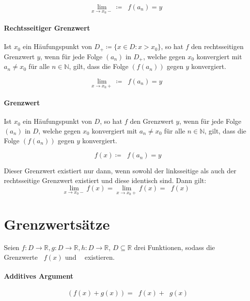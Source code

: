 \documentclass[a4paper, 11pt, accentcolor = tud3b]{tudreport}
\DeclareMathOperator{\liminfty}{\lim _ { n \rightarrow \infty }}
\DeclareMathOperator{\limx}{\lim _ { x \rightarrow x _ 0 }}
\begin{document}
                \[ \lim _ { x \rightarrow x _ 0 - } \coloneqq \liminfty f(a _ n) = y \]

            \paragraph{Rechtsseitiger Grenzwert}
                Ist $ x _ 0 $ ein Häufungspunkt von $ D _ + \coloneqq \{ x \in D : x > x _ 0 \} $, so hat $ f $ den rechtsseitigen Grenzwert $ y $, wenn für jede Folge $ (a _ n) $ in $ D _ + $, welche gegen $ x _ 0 $ konvergiert mit $ a _ n \neq x _ 0 $ für alle $ n \in \mathbb{N} $, gilt, dass die Folge $ (f(a _ n)) $ gegen $ y $ konvergiert.

                \[ \lim _ { x \rightarrow x _ 0 + } \coloneqq \liminfty f(a _ n) = y \]

            \paragraph{Grenzwert}
                Ist $ x _ 0 $ ein Häufungspunkt von $ D $, so hat $ f $ den Grenzwert $ y $, wenn für jede Folge $ (a _ n) $ in $ D $, welche gegen $ x _ 0 $ konvergiert mit $ a _ n \neq x _ 0 $ für alle $ n \in \mathbb{N} $, gilt, dass die Folge $ (f(a _ n)) $ gegen $ y $ konvergiert.

                \[ \limx f(x) \coloneqq \liminfty f(a _ n) = y \]

                Dieser Grenzwert existiert nur dann, wenn sowohl der linksseitige als auch der rechtsseitige Grenzwert existiert und diese identisch sind. Dann gilt:
                \begin{equation*}
                    \lim _ { x \rightarrow x _ 0 - } f(x) = \lim _ { x \rightarrow x _ 0 + } f(x) = \limx f(x)
                \end{equation*}

        \section{Grenzwertsätze}
            Seien $ f : D \rightarrow \mathbb{R}, g : D \rightarrow \mathbb{R}, h : D \rightarrow \mathbb{R} $, $ D \subseteq \mathbb{R} $ drei Funktionen, sodass die Grenzwerte $ \limx f(x) $ und $ \limx $ existieren.

            \paragraph{Additives Argument}
                \[ \limx (f(x) + g(x)) = \limx f(x) + \limx g(x) \]
\end{document}
